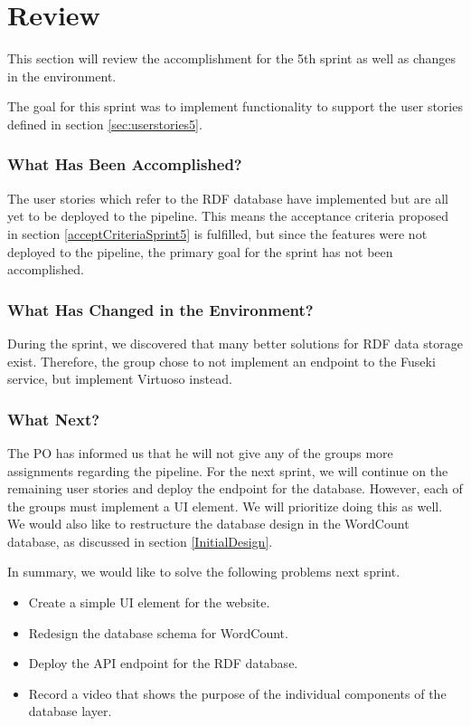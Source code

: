 \section{Review}
This section will review the accomplishment for the 5th sprint as well as changes in the \knox{} environment. 

The goal for this sprint was to implement functionality to support the user stories defined in section \ref{sec:userstories5}. 

\subsubsection*{What Has Been Accomplished?}
The user stories which refer to the RDF database have implemented but are all yet to be deployed to the \knox{} pipeline. This means the acceptance criteria proposed in section \ref{acceptCriteriaSprint5} is fulfilled, but since the features were not deployed to the pipeline, the primary goal for the sprint has not been accomplished. 

\subsubsection*{What Has Changed in the Environment?}
During the sprint, we discovered that many better solutions for RDF data storage exist. Therefore, the group chose to not implement an endpoint to the Fuseki service, but implement Virtuoso instead. 

\subsubsection*{What Next?}
The \knox{} PO has informed us that he will not give any of the \knox{} groups more assignments regarding the pipeline. 
For the next sprint, we will continue on the remaining user stories and deploy the endpoint for the database.
However, each of the \knox{} groups must implement a UI element. We will prioritize doing this as well.
We would also like to restructure the database design in the WordCount database, as discussed in section \ref{InitialDesign}.


In summary, we would like to solve the following problems next sprint.

\begin{itemize}
    \item Create a simple UI element for the \knox{} website.
    \item Redesign the database schema for WordCount.
    \item Deploy the API endpoint for the RDF database.
    \item Record a video that shows the purpose of the individual components of the database layer.
\end{itemize}
